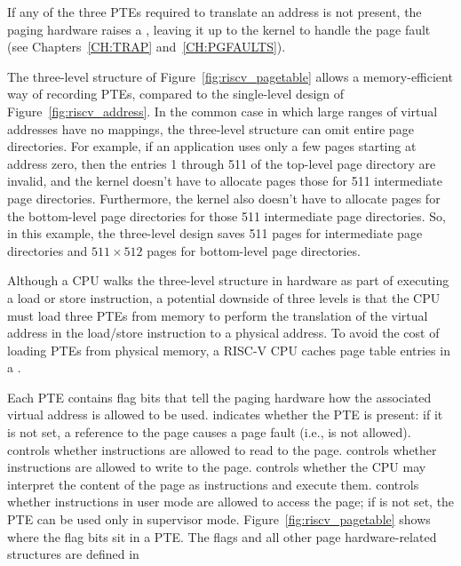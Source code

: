 If any of the three PTEs required to translate an address
is not present, the paging hardware raises a , leaving it up
to the kernel to handle the page fault (see Chapters~\ref{CH:TRAP} and~\ref{CH:PGFAULTS}).

The three-level structure of Figure~\ref{fig:riscv_pagetable} allows a
memory-efficient way of recording PTEs, compared to the single-level
design of Figure~\ref{fig:riscv_address}.  In the common case in which
large ranges of virtual addresses have no mappings, the three-level
structure can omit entire page directories.  For example, if an
application uses only a few pages starting at address zero, then the
entries 1 through 511 of the top-level page directory are invalid, and
the kernel doesn't have to allocate pages those for 511 intermediate
page directories.  Furthermore, the kernel also doesn't have to
allocate pages for the bottom-level page directories for those 511
intermediate page directories. So, in this example, the three-level
design saves 511 pages for intermediate page directories and
$511\times512$ pages for bottom-level page directories.

Although a CPU walks the three-level structure in hardware as part of
executing a load or store instruction, a potential downside of three
levels is that the CPU must load three PTEs from memory to perform the
translation of the virtual address in the load/store instruction to a
physical address.  To avoid the cost of loading PTEs from physical
memory, a RISC-V CPU caches page table entries in a
.

Each PTE contains flag bits that tell the paging hardware
how the associated virtual address is allowed to be used.
indicates whether the PTE is present: if it is
not set, a reference to the page causes a page fault (i.e., is not allowed).
controls whether instructions are allowed to 
read to the page.
controls whether instructions are allowed to 
write to the page.
controls whether the CPU may interpret the content
of the page as instructions and execute them.
controls whether instructions in user mode are allowed
to access the page;
if  is not set, the PTE can be used only in supervisor mode.
Figure~\ref{fig:riscv_pagetable}
shows where the flag bits sit in a PTE.
The flags and all other page hardware-related structures are defined in

